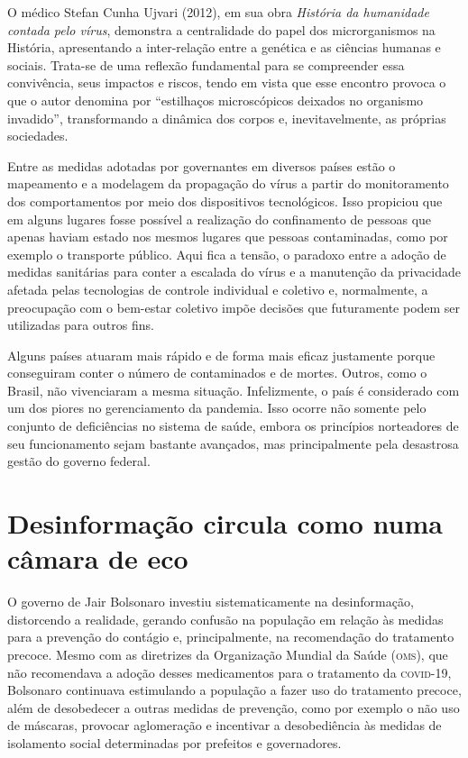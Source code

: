 O médico Stefan Cunha Ujvari (2012), em sua obra \textit{História da
humanidade contada pelo vírus}, demonstra a centralidade do papel dos
microrganismos na História, apresentando a inter-relação entre a
genética e as ciências humanas e sociais. Trata-se de uma reflexão
fundamental para se compreender essa convivência, seus impactos e
riscos, tendo em vista que esse encontro provoca o que o autor denomina
por ``estilhaços microscópicos deixados no organismo invadido'',
transformando a dinâmica dos corpos e, inevitavelmente, as próprias
sociedades.

Entre as medidas adotadas por governantes em diversos países estão o
mapeamento e a modelagem da propagação do vírus a partir do
monitoramento dos comportamentos por meio dos dispositivos tecnológicos.
Isso propiciou que em alguns lugares fosse possível a realização do
confinamento de pessoas que apenas haviam estado nos mesmos lugares que
pessoas contaminadas, como por exemplo o transporte público. Aqui fica a
tensão, o paradoxo entre a adoção de medidas sanitárias para conter a
escalada do vírus e a manutenção da privacidade afetada pelas
tecnologias de controle individual e coletivo e, normalmente, a
preocupação com o bem-estar coletivo impõe decisões que futuramente
podem ser utilizadas para outros fins.

Alguns países atuaram mais rápido e de forma mais eficaz justamente
porque conseguiram conter o número de contaminados e de mortes. Outros,
como o Brasil, não vivenciaram a mesma situação. Infelizmente, o país é
considerado com um dos piores no gerenciamento da pandemia. Isso ocorre
não somente pelo conjunto de deficiências no sistema de saúde, embora os
princípios norteadores de seu funcionamento sejam bastante avançados,
mas principalmente pela desastrosa gestão do governo federal.

\section{Desinformação circula como numa câmara de eco}

O governo de Jair Bolsonaro investiu sistematicamente na desinformação,
distorcendo a realidade, gerando confusão na população em relação às
medidas para a prevenção do contágio e, principalmente, na recomendação
do tratamento precoce. Mesmo com as diretrizes da Organização Mundial da
Saúde (\textsc{oms}), que não recomendava a adoção desses medicamentos para o
tratamento da \textsc{covid-19}, Bolsonaro continuava estimulando a população a
fazer uso do tratamento precoce, além de desobedecer a outras medidas de
prevenção, como por exemplo o não uso de máscaras, provocar aglomeração
e incentivar a desobediência às medidas de isolamento social
determinadas por prefeitos e governadores.

